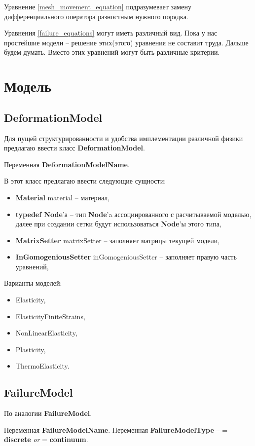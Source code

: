\documentclass[a4paper,12pt]{article}
\numberwithin{equation}{section}
\begin{document}
	Уравнение \eqref{mesh_movement_equation} подразумевает замену дифференциального оператора разностным нужного порядка.
	
	Уравнения \eqref{failure_equations} могут иметь различный вид. Пока у нас простейшие модели -- решение этих(этого) уравнения не составит труда. Дальше будем думать.
	Вместо этих уравнений могут быть различные критерии.
	
\section{Модель}
\subsection{DeformationModel}
	Для пущей структурированности и удобства имплементации различной физики предлагаю ввести класс \textbf{DeformationModel}.
	
	Переменная \textbf{DeformationModelName}.
	
	В этот класс предлагаю ввести следующие сущности:
	\begin{itemize}
		\item{\textbf{Material} material -- материал,}
		\item{\textbf{typedef Node}'а -- тип \textbf{Node}'a ассоциированного с расчитываемой моделью, далее при создании сетки будут использоваться \textbf{Node}'ы этого типа,}
		\item{\textbf{MatrixSetter} matrixSetter -- заполняет матрицы текущей модели,}
		\item{\textbf{InGomogeniousSetter} inGomogeniousSetter -- заполняет правую часть уравнений,}
	\end{itemize}
	
	Варианты моделей:
	\begin{itemize}
		\item{Elasticity,}
		\item{ElasticityFiniteStrains,}
		\item{NonLinearElasticity,}
		\item{Plasticity,}
		\item{ThermoElasticity.}
	\end{itemize}
	
\subsection{FailureModel}
	По аналогии \textbf{FailureModel}.
	
	Переменная \textbf{FailureModelName}.
	Переменная \textbf{FailureModelType} -- = \textbf{discrete} \textit{or} = \textbf{continuum}.
	
\end{document}
